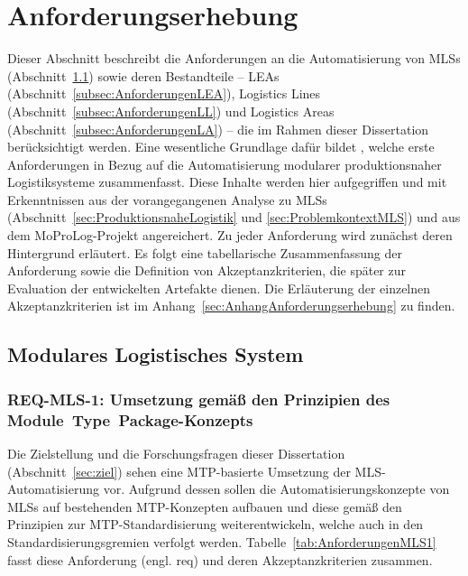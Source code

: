 \section{Anforderungserhebung}
\label{sec:Anforderungen}

Dieser Abschnitt beschreibt die Anforderungen an die Automatisierung von MLSs (Abschnitt~\ref{subsec:AnforderungenMLS}) sowie deren Bestandteile -- LEAs (Abschnitt~\ref{subsec:AnforderungenLEA}), Logistics Lines (Abschnitt~\ref{subsec:AnforderungenLL}) und Logistics Areas (Abschnitt~\ref{subsec:AnforderungenLA}) -- die im Rahmen dieser Dissertation berücksichtigt werden. Eine wesentliche Grundlage dafür bildet \cite{NAMURAK4.19.2020}, welche erste Anforderungen in Bezug auf die Automatisierung modularer produktionsnaher Logistiksysteme zusammenfasst. Diese Inhalte werden hier aufgegriffen und mit Erkenntnissen aus der vorangegangenen Analyse zu MLSs (Abschnitt~\ref{sec:ProduktionsnaheLogistik} und \ref{sec:ProblemkontextMLS}) und aus dem MoProLog-Projekt \cite{Blumenstein.MoProLog} angereichert. Zu jeder Anforderung wird zunächst deren Hintergrund erläutert. Es folgt eine tabellarische Zusammenfassung der Anforderung sowie die Definition von Akzeptanzkriterien, die später zur Evaluation der entwickelten Artefakte dienen. Die Erläuterung der einzelnen Akzeptanzkriterien ist im Anhang~\ref{sec:AnhangAnforderungserhebung} zu finden.

\subsection{Modulares Logistisches System}
\label{subsec:AnforderungenMLS}

\subsubsection{REQ-MLS-1: Umsetzung gemäß den Prinzipien des Module~Type~Package-Konzepts}

Die Zielstellung und die Forschungsfragen dieser Dissertation (Abschnitt~\ref{sec:ziel}) sehen eine MTP-basierte Umsetzung der MLS-Automatisierung vor. Aufgrund dessen sollen die Automatisierungskonzepte von MLSs auf bestehenden MTP-Konzepten aufbauen und diese gemäß den Prinzipien zur MTP-Standardisierung weiterentwickeln, welche auch in den Standardisierungsgremien verfolgt werden. Tabelle~\ref{tab:AnforderungenMLS1} fasst diese Anforderung (engl. \gls{req}) und deren Akzeptanzkriterien zusammen.


